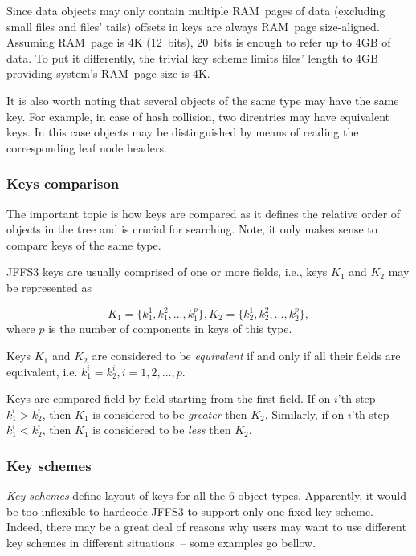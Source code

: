 Since data objects may only contain multiple RAM~pages of data (excluding small
files and files' tails) offsets in keys are always RAM~page
\mbox{size-aligned}. Assuming RAM~page is 4K (12~bits), 20~bits is enough to
refer up to 4GB of data. To put it differently, the trivial key scheme limits
files' length to 4GB providing system's RAM~page size is 4K.

It is also worth noting that several objects of the same type may have the same
key. For example, in case of hash collision, two direntries may have equivalent
keys. In this case objects may be distinguished by means of reading the
corresponding leaf node headers.

%
%
\subsubsection{Keys comparison}

The important topic is how keys are compared as it defines the relative order
of objects in the tree and is crucial for searching. Note, it only makes sense
to compare keys of the same type.

JFFS3 keys are usually comprised of one or more fields, i.e., keys $K_1$ and
$K_2$ may be represented as

$$
K_1 = \{k^1_1, k^2_1, ..., k^p_1\},
K_2 = \{k^1_2, k^2_2, ..., k^p_2\},
$$
where $p$ is the number of components in keys of this type.

Keys $K_1$ and $K_2$ are considered to be \emph{equivalent} if and only if all
their fields are equivalent, i.e. $k^i_1 = k^i_2, i = 1, 2, ..., p$.

Keys are compared \mbox{field-by-field} starting from the first field. If on
$i$'th step $k^i_1 > k^i_2$, then $K_1$ is considered to be \emph{greater} then
$K_2$.  Similarly, if on $i$'th step $k^i_1 < k^i_2$, then $K_1$ is considered
to be \emph{less} then $K_2$.

%
%
\subsubsection{Key schemes}

\emph{Key schemes} define layout of keys for all the 6 object types.
Apparently, it would be too inflexible to hardcode JFFS3 to support only one
fixed key scheme. Indeed, there may be a great deal of reasons why users may
want to use different key schemes in different situations~-- some examples go
bellow.

